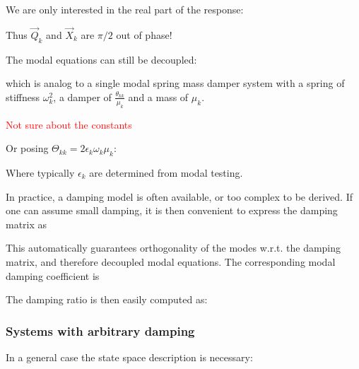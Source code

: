 \documentclass[10pt,a4paper]{scrartcl}
\begin{document}
\begin{multicols*}{2}
We are only interested in the real part of the response:


Thus $\vec{Q}_k$ and $\vec{X}_k$ are $\pi/2$ out of phase!

The modal equations can still be decoupled:


which is analog to a single modal spring mass damper system with a spring of stiffness $\omega_k^2$, a damper of $\frac{\theta_{kk}}{\mu_k}$ and a mass of $\mu_k$.

\textcolor{red}{Not sure about the constants}

\vspace{3ex}

Or posing $\Theta_{kk}=2\epsilon_k\omega_k\mu_k$:


Where typically $\epsilon_k$ are determined from modal testing.

\vspace{3ex}

In practice, a damping model is often available, or too complex to be derived. If one can assume small damping, it is then convenient to express the damping matrix as


This automatically guarantees orthogonality of the modes w.r.t. the damping matrix, and therefore decoupled modal equations. The corresponding modal damping coefficient is


The damping ratio is then easily computed as:


\subsubsection{Systems with arbitrary damping}

In a general case the state space description is necessary:


\end{multicols*}
\end{document}
